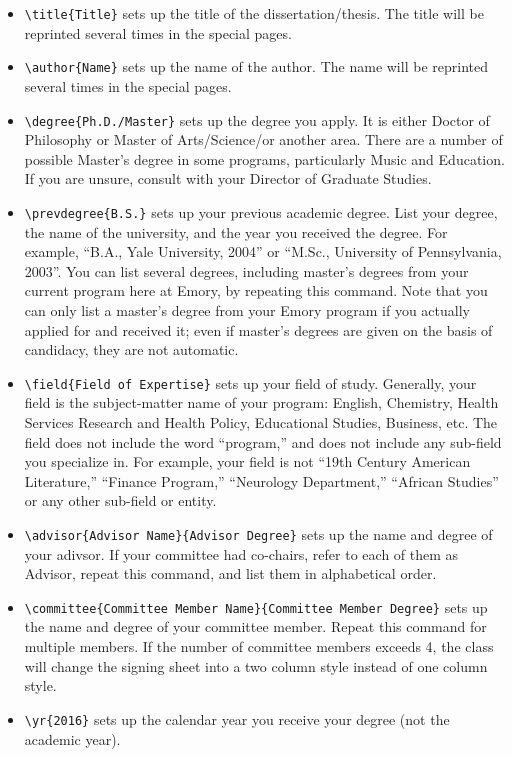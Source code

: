 \documentclass[draft, twoside]{emory}
\begin{document}
\begin{itemize}
\item \Verb|\title{Title}| sets up the title of the dissertation/thesis. The title 
will be reprinted several times in the special pages.
\item \Verb|\author{Name}| sets up the name of the author. The name will be reprinted
several times in the special pages. 
\item \Verb|\degree{Ph.D./Master}| sets up the degree you apply. It is either Doctor
of Philosophy or Master of Arts/Science/or another area.  There are a number of 
possible Master’s degree in some programs, particularly Music and Education.  
If you are unsure, consult with your Director of Graduate Studies.
\item \Verb|\prevdegree{B.S.}| sets up your previous academic degree. List your 
degree, the name of the university, and the year you received the degree.  
For example, ``B.A., Yale University, 2004'' or ``M.Sc., University of Pennsylvania, 2003''.
You can list several degrees, including master’s degrees from your current 
program here at Emory, by repeating this command.
Note that you can only list a master’s degree from your
Emory program if you actually applied for and received it; even if master’s 
degrees are given on the basis of candidacy, they are not automatic. 
\item \Verb|\field{Field of Expertise}| sets up your field of study. Generally, 
your field is the subject-matter name of your program: English, Chemistry, 
Health Services Research and Health Policy, Educational Studies, Business, etc.  
The field does not include the word “program,” and does not include any sub-field
you specialize in.  For example, your field is not ``19th Century American Literature,''
``Finance Program,'' ``Neurology Department,'' ``African Studies'' or any other
sub-field or entity.
\item \Verb|\advisor{Advisor Name}{Advisor Degree}| sets up the name and degree of your 
adivsor. If your committee had co-chairs, refer to each of them as Advisor,
repeat this command, and list them in alphabetical order. 
\item \Verb|\committee{Committee Member Name}{Committee Member Degree}|  sets up
the name and degree of your committee member. Repeat this command for multiple 
members. If the number of committee members exceeds 4, the class will change
the signing sheet into a two column style instead of one column style.
\item \Verb|\yr{2016}| sets up the calendar year you receive your degree
(not the academic year).
\end{itemize}
\end{document}
